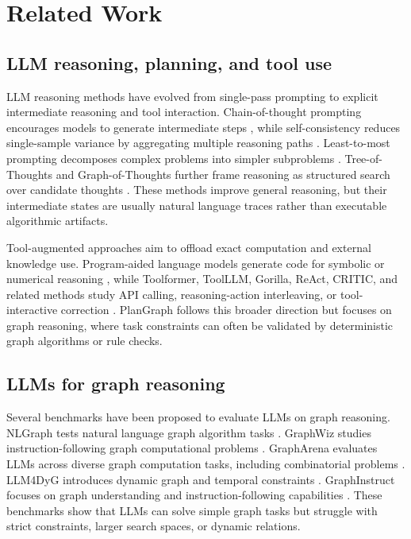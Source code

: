 \documentclass[pdflatex,sn-mathphys-num]{sn-jnl}
\theoremstyle{thmstyleone}
\theoremstyle{thmstyletwo}
\theoremstyle{thmstylethree}
\begin{document}
\section{Related Work}\label{sec:related}

\subsection{LLM reasoning, planning, and tool use}

LLM reasoning methods have evolved from single-pass prompting to explicit intermediate reasoning and tool interaction. Chain-of-thought prompting encourages models to generate intermediate steps \cite{wei2022chain}, while self-consistency reduces single-sample variance by aggregating multiple reasoning paths \cite{wang2023selfconsistency}. Least-to-most prompting decomposes complex problems into simpler subproblems \cite{zhou2023least}. Tree-of-Thoughts and Graph-of-Thoughts further frame reasoning as structured search over candidate thoughts \cite{yao2023tree,besta2024graph}. These methods improve general reasoning, but their intermediate states are usually natural language traces rather than executable algorithmic artifacts.

Tool-augmented approaches aim to offload exact computation and external knowledge use. Program-aided language models generate code for symbolic or numerical reasoning \cite{gao2023pal}, while Toolformer, ToolLLM, Gorilla, ReAct, CRITIC, and related methods study API calling, reasoning-action interleaving, or tool-interactive correction \cite{schick2023toolformer,qin2023toolllm,gorilla2024,yao2023react,critic2024}. PlanGraph follows this broader direction but focuses on graph reasoning, where task constraints can often be validated by deterministic graph algorithms or rule checks.

\subsection{LLMs for graph reasoning}

Several benchmarks have been proposed to evaluate LLMs on graph reasoning. NLGraph tests natural language graph algorithm tasks \cite{chen2024nlgraph}. GraphWiz studies instruction-following graph computational problems \cite{gong2024graphwiz}. GraphArena evaluates LLMs across diverse graph computation tasks, including combinatorial problems \cite{tang2025grapharena}. LLM4DyG introduces dynamic graph and temporal constraints \cite{llm4dyg2024}. GraphInstruct focuses on graph understanding and instruction-following capabilities \cite{graphinstruct2024}. These benchmarks show that LLMs can solve simple graph tasks but struggle with strict constraints, larger search spaces, or dynamic relations.
\end{document}

